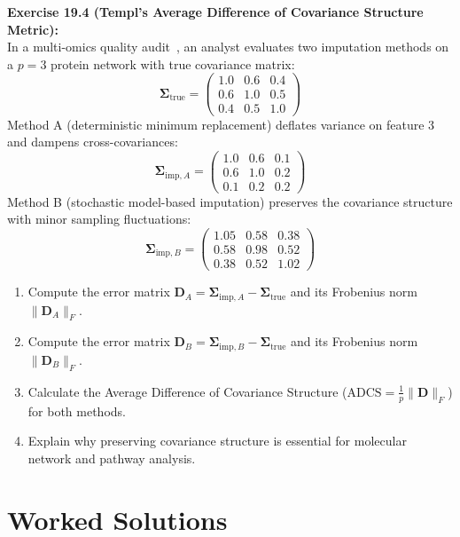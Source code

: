 \documentclass[11pt,oneside]{book}
\begin{document}
\vspace{0.8em}
\noindent
\textbf{Exercise 19.4 (Templ's Average Difference of Covariance Structure Metric):}\\
In a multi-omics quality audit~\cite{templ2023visualization}, an analyst evaluates two imputation methods on a $p = 3$ protein network with true covariance matrix:
$$\boldsymbol{\Sigma}_{\text{true}} = \begin{pmatrix} 1.0 & 0.6 & 0.4 \\ 0.6 & 1.0 & 0.5 \\ 0.4 & 0.5 & 1.0 \end{pmatrix}$$
Method A (deterministic minimum replacement) deflates variance on feature 3 and dampens cross-covariances:
$$\boldsymbol{\Sigma}_{\text{imp}, A} = \begin{pmatrix} 1.0 & 0.6 & 0.1 \\ 0.6 & 1.0 & 0.2 \\ 0.1 & 0.2 & 0.2 \end{pmatrix}$$
Method B (stochastic model-based imputation) preserves the covariance structure with minor sampling fluctuations:
$$\boldsymbol{\Sigma}_{\text{imp}, B} = \begin{pmatrix} 1.05 & 0.58 & 0.38 \\ 0.58 & 0.98 & 0.52 \\ 0.38 & 0.52 & 1.02 \end{pmatrix}$$
\begin{enumerate}
    \item Compute the error matrix $\mathbf{D}_A = \boldsymbol{\Sigma}_{\text{imp}, A} - \boldsymbol{\Sigma}_{\text{true}}$ and its Frobenius norm $\|\mathbf{D}_A\|_F$.
    \item Compute the error matrix $\mathbf{D}_B = \boldsymbol{\Sigma}_{\text{imp}, B} - \boldsymbol{\Sigma}_{\text{true}}$ and its Frobenius norm $\|\mathbf{D}_B\|_F$.
    \item Calculate the Average Difference of Covariance Structure ($\text{ADCS} = \frac{1}{p} \|\mathbf{D}\|_F$) for both methods.
    \item Explain why preserving covariance structure is essential for molecular network and pathway analysis.
\end{enumerate}

\section{Worked Solutions}
\end{document}
